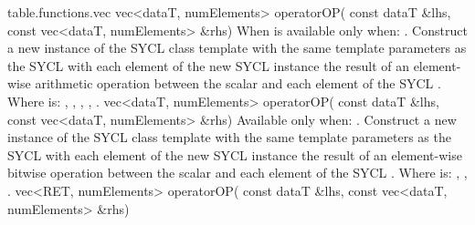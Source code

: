 {table.functions.vec}
  \addRowThreeL
  { vec<dataT, numElements> operatorOP( }
  { const dataT \&lhs, }
  { const vec<dataT, numElements> \&rhs) }
  {
    When  is \codeinline{\%} available only when: .
    \newline
    Construct a new instance of the SYCL  class template with
    the same template parameters as the  SYCL 
    with each element of the new SYCL  instance the result of
    an element-wise  arithmetic operation between the
     scalar and each element of the  SYCL
    .
    \newline \newline
    Where  is: \codeinline{+}, \codeinline{-}, \codeinline{*},
    \codeinline{/}, \codeinline{\%}.
  }
  \addRowThreeL
  { vec<dataT, numElements> operatorOP( }
  { const dataT \&lhs, }
  { const vec<dataT, numElements> \&rhs) }
  {
    Available only when: .
    \newline
    Construct a new instance of the SYCL  class template with
    the same template parameters as the  SYCL 
    with each element of the new SYCL  instance the result of
    an element-wise  bitwise operation between the  scalar and each element of the  SYCL .
    \newline \newline
    Where  is: \codeinline{\&}, \codeinline{|}, \codeinline{^}.
  }
  \addRowThreeL
  { vec<RET, numElements> operatorOP( }
  { const dataT \&lhs, }
  { const vec<dataT, numElements> \&rhs) }
